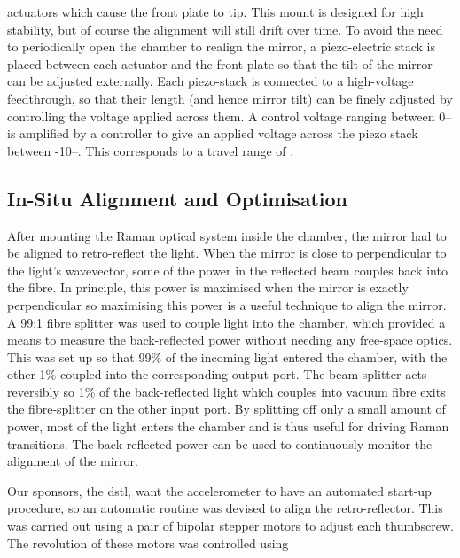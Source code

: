 actuators which cause the front plate to tip. This mount
is designed for high stability, but of course the alignment will still drift
over time. To avoid the need to periodically open the chamber to realign the
mirror, a piezo-electric stack is placed between each actuator and the front
plate so that the tilt of the mirror can be adjusted externally. Each
piezo-stack is connected to a high-voltage feedthrough, so that their length
(and hence mirror tilt) can be finely adjusted by controlling the voltage
applied across them. A control voltage ranging between 0-- is
amplified by a controller to give an applied voltage across the piezo stack
between -10--. This corresponds to a travel range of
.
\subsection{In-Situ Alignment and Optimisation}\label{sec:in_situ} 
After mounting the Raman optical system inside the chamber, the
mirror had to be aligned to retro-reflect the light. When the mirror is close to
perpendicular to the light's wavevector, some of the power in the reflected beam
couples back into the fibre. In principle, this power is maximised when the
mirror is exactly perpendicular so maximising this power is a useful technique
to align the mirror. A 99:1 fibre splitter was used to couple light into the
chamber, which provided a means to measure the back-reflected power without
needing any free-space optics. This was set up so that 99\% of the incoming
light entered the chamber, with the other 1\% coupled into the corresponding
output port. The beam-splitter acts reversibly so 1\% of the
back-reflected light which couples into vacuum fibre exits the fibre-splitter on
the other input port.  
By splitting off only a small amount of
power, most of the light enters the chamber and is thus useful for
driving Raman transitions. The back-reflected power can be used to 
continuously monitor the alignment of the mirror.
\par\noindent 
Our sponsors, the dstl, want the accelerometer to have an automated
start-up procedure, so an automatic routine was devised to align
the retro-reflector. This was carried out using
a pair of bipolar stepper motors to adjust each thumbscrew. The revolution of these motors was controlled using
